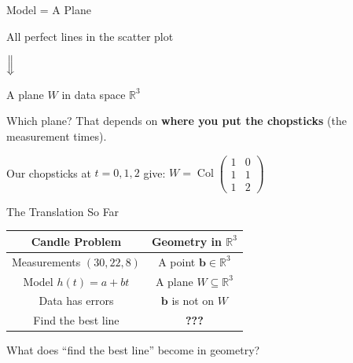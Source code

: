 \documentclass[10pt]{beamer}
\theoremstyle{definition}
\newcommand{\x}[1]{\alert{\textbf{#1}}}
\begin{document}
\begin{frame}{Model = A Plane}

\begin{center}
\large
All perfect lines in the scatter plot

$\Big\Downarrow$

\vspace{0.5em}

A plane $W$ in data space $\mathbb{R}^3$
\end{center}

\vspace{0.5em}

Which plane? That depends on \x{where you put the chopsticks} (the measurement times).

\vspace{0.3em}

Our chopsticks at $t = 0, 1, 2$ give: $W = \operatorname{Col}\begin{pmatrix} 1 & 0 \\ 1 & 1 \\ 1 & 2 \end{pmatrix}$

\end{frame}


\begin{frame}{The Translation So Far}

\renewcommand{\arraystretch}{1.4}
\begin{center}
\begin{tabular}{c|c}
\textbf{Candle Problem} & \textbf{Geometry in $\mathbb{R}^3$} \\
\hline
Measurements $(30, 22, 8)$ & A point $\mathbf{b} \in \mathbb{R}^3$ \\
Model $h(t) = a+bt$ & A plane $W \subseteq \mathbb{R}^3$ \\
Data has errors & $\mathbf{b}$ is not on $W$ \\
\hline
Find the best line & \x{???}
\end{tabular}
\end{center}

\vspace{1em}

What does ``find the best line'' become in geometry?

\end{frame}
\end{document}

